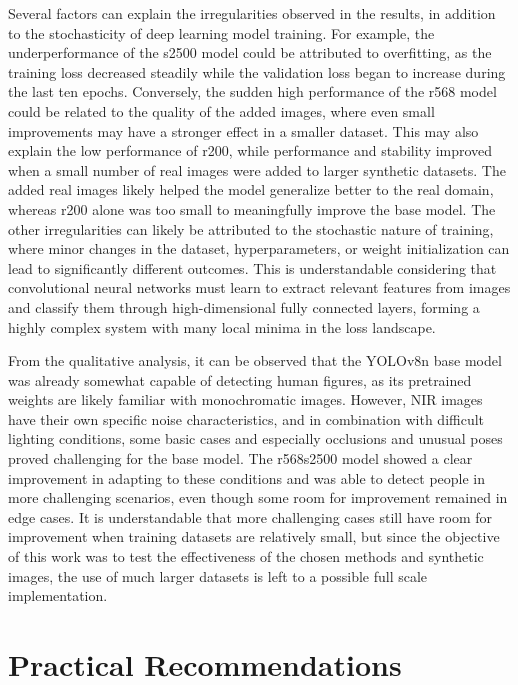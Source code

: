 Several factors can explain the irregularities observed in the results, in addition to the stochasticity of deep learning model training. For example, the underperformance of the s2500 model could be attributed to overfitting, as the training loss decreased steadily while the validation loss began to increase during the last ten epochs. Conversely, the sudden high performance of the r568 model could be related to the quality of the added images, where even small improvements may have a stronger effect in a smaller dataset. This may also explain the low performance of r200, while performance and stability improved when a small number of real images were added to larger synthetic datasets. The added real images likely helped the model generalize better to the real domain, whereas r200 alone was too small to meaningfully improve the base model. The other irregularities can likely be attributed to the stochastic nature of training, where minor changes in the dataset, hyperparameters, or weight initialization can lead to significantly different outcomes. This is understandable considering that convolutional neural networks must learn to extract relevant features from images and classify them through high-dimensional fully connected layers, forming a highly complex system with many local minima in the loss landscape.

From the qualitative analysis, it can be observed that the YOLOv8n base model was already somewhat capable of detecting human figures, as its pretrained weights are likely familiar with monochromatic images. However, NIR images have their own specific noise characteristics, and in combination with difficult lighting conditions, some basic cases and especially occlusions and unusual poses proved challenging for the base model. The r568s2500 model showed a clear improvement in adapting to these conditions and was able to detect people in more challenging scenarios, even though some room for improvement remained in edge cases. It is understandable that more challenging cases still have room for improvement when training datasets are relatively small, but since the objective of this work was to test the effectiveness of the chosen methods and synthetic images, the use of much larger datasets is left to a possible full scale implementation.

\section{Practical Recommendations}

